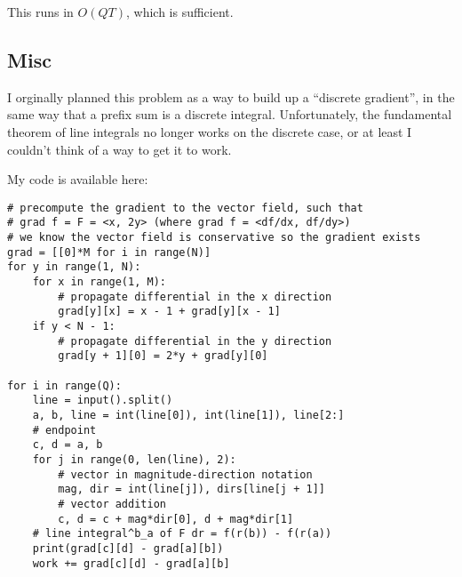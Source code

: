 \documentclass[11pt, oneside]{article}
\begin{document}
This runs in \( O(QT) \), which is sufficient.

\newpage

\subsection{Misc}

I orginally planned this problem as a way to build up a ``discrete gradient'',
in the same way that a prefix sum is a discrete integral.
Unfortunately, the fundamental theorem of line integrals no longer works
on the discrete case, or at least I couldn't think of a way to get it to work.

My code is available here:
\begin{verbatim}
# precompute the gradient to the vector field, such that
# grad f = F = <x, 2y> (where grad f = <df/dx, df/dy>)
# we know the vector field is conservative so the gradient exists
grad = [[0]*M for i in range(N)]
for y in range(1, N):
    for x in range(1, M):
        # propagate differential in the x direction
        grad[y][x] = x - 1 + grad[y][x - 1]
    if y < N - 1:
        # propagate differential in the y direction
        grad[y + 1][0] = 2*y + grad[y][0]

for i in range(Q):
    line = input().split()
    a, b, line = int(line[0]), int(line[1]), line[2:]
    # endpoint
    c, d = a, b
    for j in range(0, len(line), 2):
        # vector in magnitude-direction notation
        mag, dir = int(line[j]), dirs[line[j + 1]]
        # vector addition
        c, d = c + mag*dir[0], d + mag*dir[1]
    # line integral^b_a of F dr = f(r(b)) - f(r(a))
    print(grad[c][d] - grad[a][b])
    work += grad[c][d] - grad[a][b]
\end{verbatim}
\end{document}

